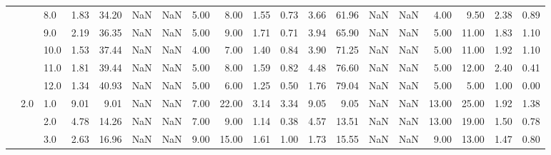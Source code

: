 \begin{tabular}{lllrrrrrrrrrrrrrrrr}
          &     & 8.0  &      1.83 &      34.20 &               NaN &                NaN &  5.00 &   8.00 &             1.55 &                         0.73 &      3.66 &      61.96 &               NaN &                NaN &  4.00 &   9.50 &             2.38 &                         0.89 \\
          &     & 9.0  &      2.19 &      36.35 &               NaN &                NaN &  5.00 &   9.00 &             1.71 &                         0.71 &      3.94 &      65.90 &               NaN &                NaN &  5.00 &  11.00 &             1.83 &                         1.10 \\
          &     & 10.0 &      1.53 &      37.44 &               NaN &                NaN &  4.00 &   7.00 &             1.40 &                         0.84 &      3.90 &      71.25 &               NaN &                NaN &  5.00 &  11.00 &             1.92 &                         1.10 \\
          &     & 11.0 &      1.81 &      39.44 &               NaN &                NaN &  5.00 &   8.00 &             1.59 &                         0.82 &      4.48 &      76.60 &               NaN &                NaN &  5.00 &  12.00 &             2.40 &                         0.41 \\
          &     & 12.0 &      1.34 &      40.93 &               NaN &                NaN &  5.00 &   6.00 &             1.25 &                         0.50 &      1.76 &      79.04 &               NaN &                NaN &  5.00 &   5.00 &             1.00 &                         0.00 \\
          & 2.0 & 1.0  &      9.01 &       9.01 &               NaN &                NaN &  7.00 &  22.00 &             3.14 &                         3.34 &      9.05 &       9.05 &               NaN &                NaN & 13.00 &  25.00 &             1.92 &                         1.38 \\
          &     & 2.0  &      4.78 &      14.26 &               NaN &                NaN &  7.00 &   9.00 &             1.14 &                         0.38 &      4.57 &      13.51 &               NaN &                NaN & 13.00 &  19.00 &             1.50 &                         0.78 \\
          &     & 3.0  &      2.63 &      16.96 &               NaN &                NaN &  9.00 &  15.00 &             1.61 &                         1.00 &      1.73 &      15.55 &               NaN &                NaN &  9.00 &  13.00 &             1.47 &                         0.80 \\

\end{tabular}
